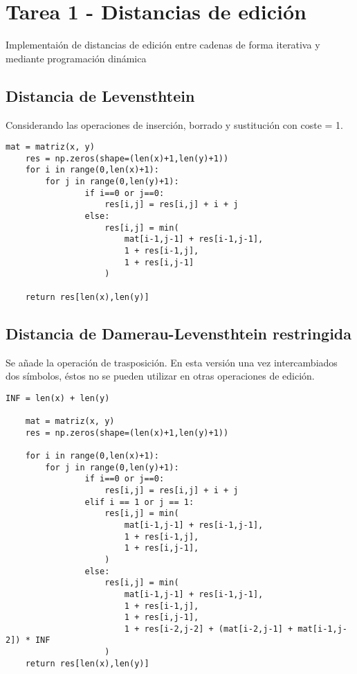 \section{Tarea 1 - Distancias de edición}
Implementaión de distancias de edición entre cadenas de forma iterativa y mediante programación dinámica

\subsection{Distancia de Levensthtein}
Considerando las operaciones de inserción, borrado y sustitución con coste = 1.

\begin{lstlisting}[caption=Algoritmo distancia de levenshtein]
    mat = matriz(x, y)
    res = np.zeros(shape=(len(x)+1,len(y)+1))
    for i in range(0,len(x)+1):
        for j in range(0,len(y)+1):
                if i==0 or j==0:
                    res[i,j] = res[i,j] + i + j
                else:
                    res[i,j] = min(
                        mat[i-1,j-1] + res[i-1,j-1],
                        1 + res[i-1,j],
                        1 + res[i,j-1]
                    )

    return res[len(x),len(y)]
\end{lstlisting}


\subsection{Distancia de Damerau-Levensthtein restringida}
Se añade la operación de trasposición. En esta versión una vez intercambiados dos
símbolos, éstos no se pueden utilizar en otras operaciones de edición.

\begin{lstlisting}[label={list:first},caption=Sample Python code -- Damerau-Levensthtein restringido]
    INF = len(x) + len(y)

    mat = matriz(x, y)
    res = np.zeros(shape=(len(x)+1,len(y)+1))

    for i in range(0,len(x)+1):
        for j in range(0,len(y)+1):
                if i==0 or j==0:
                    res[i,j] = res[i,j] + i + j
                elif i == 1 or j == 1:
                    res[i,j] = min(
                        mat[i-1,j-1] + res[i-1,j-1],
                        1 + res[i-1,j],
                        1 + res[i,j-1],
                    )
                else:
                    res[i,j] = min(
                        mat[i-1,j-1] + res[i-1,j-1],
                        1 + res[i-1,j],
                        1 + res[i,j-1],
                        1 + res[i-2,j-2] + (mat[i-2,j-1] + mat[i-1,j-2]) * INF
                    )
    return res[len(x),len(y)]
\end{lstlisting}

